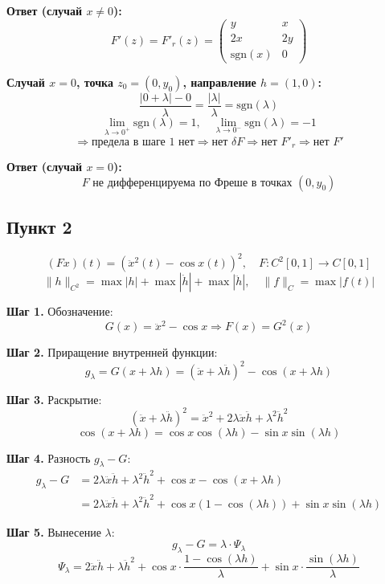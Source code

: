 \documentclass[a4paper, 12pt]{article}
\begin{document}
\textbf{Ответ (случай $x \neq 0$):}
\[
\boxed{F'(z) = F'_r(z) = 
\begin{pmatrix}
y & x \\
2x & 2y \\
\text{sgn}(x) & 0
\end{pmatrix}}
\]

\vspace{0.3cm}
\textbf{Случай $x = 0$, точка $z_0 = (0, y_0)$, направление $h = (1, 0)$:}
\[
\frac{|0 + \lambda| - 0}{\lambda} = \frac{|\lambda|}{\lambda} = \text{sgn}(\lambda)
\]
\[
\lim_{\lambda \to 0^+} \text{sgn}(\lambda) = 1, \quad \lim_{\lambda \to 0^-} \text{sgn}(\lambda) = -1
\]
\[
\Rightarrow \text{предела в шаге 1 нет} \Rightarrow \text{нет } \delta F \Rightarrow \text{нет } F'_r \Rightarrow \text{нет } F'
\]

\textbf{Ответ (случай $x = 0$):}
\[
\boxed{F \text{ не дифференцируема по Фреше в точках } (0, y_0)}
\]

\newpage
\subsection*{Пункт 2}

\[
(Fx)(t) = (\ddot{x}^2(t) - \cos x(t))^2, \quad F: C^2[0,1] \to C[0,1]
\]
\[
\|h\|_{C^2} = \max|h| + \max|\dot{h}| + \max|\ddot{h}|, \quad \|f\|_C = \max|f(t)|
\]

\textbf{Шаг 1.} Обозначение:
\[
G(x) = \ddot{x}^2 - \cos x \Rightarrow F(x) = G^2(x)
\]

\textbf{Шаг 2.} Приращение внутренней функции:
\[
g_\lambda = G(x + \lambda h) = (\ddot{x} + \lambda \ddot{h})^2 - \cos(x + \lambda h)
\]

\textbf{Шаг 3.} Раскрытие:
\[
(\ddot{x} + \lambda \ddot{h})^2 = \ddot{x}^2 + 2\lambda \ddot{x} \ddot{h} + \lambda^2 \ddot{h}^2
\]
\[
\cos(x + \lambda h) = \cos x \cos(\lambda h) - \sin x \sin(\lambda h)
\]

\textbf{Шаг 4.} Разность $g_\lambda - G$:
\begin{align*}
g_\lambda - G &= 2\lambda \ddot{x} \ddot{h} + \lambda^2 \ddot{h}^2 + \cos x - \cos(x + \lambda h) \\
&= 2\lambda \ddot{x} \ddot{h} + \lambda^2 \ddot{h}^2 + \cos x (1 - \cos(\lambda h)) + \sin x \sin(\lambda h)
\end{align*}

\textbf{Шаг 5.} Вынесение $\lambda$:
\[
g_\lambda - G = \lambda \cdot \Psi_\lambda
\]
\[
\Psi_\lambda = 2\ddot{x}\ddot{h} + \lambda \ddot{h}^2 + \cos x \cdot \frac{1 - \cos(\lambda h)}{\lambda} + \sin x \cdot \frac{\sin(\lambda h)}{\lambda}
\]
\end{document}
